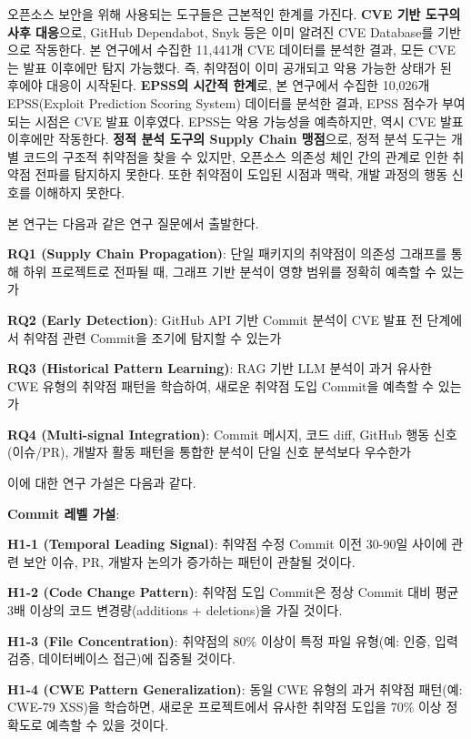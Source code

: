 ﻿\documentclass[conference]{IEEEtran}
\begin{document}
오픈소스 보안을 위해 사용되는 도구들은 근본적인 한계를 가진다. \textbf{CVE 기반 도구의 사후 대응}으로, GitHub Dependabot, Snyk 등은 이미 알려진 CVE Database를 기반으로 작동한다. 본 연구에서 수집한 11,441개 CVE 데이터를 분석한 결과, 모든 CVE는 발표 이후에만 탐지 가능했다. 즉, 취약점이 이미 공개되고 악용 가능한 상태가 된 후에야 대응이 시작된다. \textbf{EPSS의 시간적 한계}로, 본 연구에서 수집한 10,026개 EPSS(Exploit Prediction Scoring System) 데이터를 분석한 결과, EPSS 점수가 부여되는 시점은 CVE 발표 이후였다. EPSS는 악용 가능성을 예측하지만, 역시 CVE 발표 이후에만 작동한다. \textbf{정적 분석 도구의 Supply Chain 맹점}으로, 정적 분석 도구는 개별 코드의 구조적 취약점을 찾을 수 있지만, 오픈소스 의존성 체인 간의 관계로 인한 취약점 전파를 탐지하지 못한다. 또한 취약점이 도입된 시점과 맥락, 개발 과정의 행동 신호를 이해하지 못한다.

\indent 본 연구는 다음과 같은 연구 질문에서 출발한다.

\noindent\textbf{RQ1 (Supply Chain Propagation)}: 단일 패키지의 취약점이 의존성 그래프를 통해 하위 프로젝트로 전파될 때, 그래프 기반 분석이 영향 범위를 정확히 예측할 수 있는가

\noindent\textbf{RQ2 (Early Detection)}: GitHub API 기반 Commit 분석이 CVE 발표 전 단계에서 취약점 관련 Commit을 조기에 탐지할 수 있는가

\noindent\textbf{RQ3 (Historical Pattern Learning)}: RAG 기반 LLM 분석이 과거 유사한 CWE 유형의 취약점 패턴을 학습하여, 새로운 취약점 도입 Commit을 예측할 수 있는가

\noindent\textbf{RQ4 (Multi-signal Integration)}: Commit 메시지, 코드 diff, GitHub 행동 신호(이슈/PR), 개발자 활동 패턴을 통합한 분석이 단일 신호 분석보다 우수한가

\noindent 이에 대한 연구 가설은 다음과 같다.

\noindent\textbf{Commit 레벨 가설}:

\noindent\textbf{H1-1 (Temporal Leading Signal)}: 취약점 수정 Commit 이전 30-90일 사이에 관련 보안 이슈, PR, 개발자 논의가 증가하는 패턴이 관찰될 것이다.

\noindent\textbf{H1-2 (Code Change Pattern)}: 취약점 도입 Commit은 정상 Commit 대비 평균 3배 이상의 코드 변경량(additions + deletions)을 가질 것이다.

\noindent\textbf{H1-3 (File Concentration)}: 취약점의 80\% 이상이 특정 파일 유형(예: 인증, 입력 검증, 데이터베이스 접근)에 집중될 것이다.

\noindent\textbf{H1-4 (CWE Pattern Generalization)}: 동일 CWE 유형의 과거 취약점 패턴(예: CWE-79 XSS)을 학습하면, 새로운 프로젝트에서 유사한 취약점 도입을 70\% 이상 정확도로 예측할 수 있을 것이다.
\end{document}
